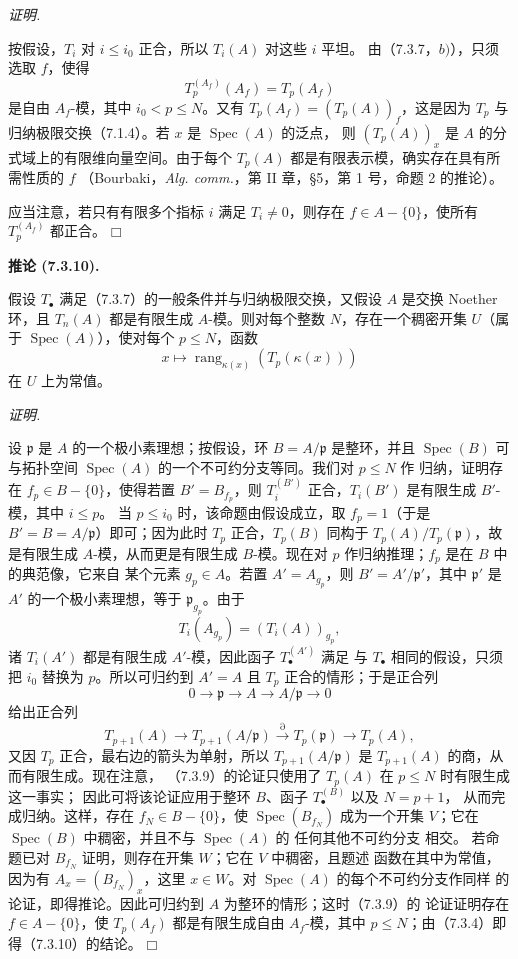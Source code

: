 \documentclass[UTF8,fontset=none,11pt,oneside,openany]{ctexbook}
\providecommand{\square}{\mdlgwhtsquare}
\newenvironment{corollary}[1][]{%
  \par\medskip\noindent\textbf{推论 (#1).}\ %
}{\par}
\newenvironment{proof}{%
  \par\smallskip\noindent\textit{证明.}\ %
}{\hfill$\square$\par}
\newcommand{\oldpage}[2][]{%
  \hypertarget{ega-source-page-#1-#2}{}%
  \marginnote{\scriptsize\textbf{#1}~|~#2}\ignorespaces}
\begin{document}
\begin{proof}
按假设，$T_i$ 对 $i\leq i_0$ 正合，所以 $T_i(A)$ 对这些 $i$ 平坦。
由（7.3.7，$b)$），只须选取 $f$，使得
\[
  T_p^{(A_f)}(A_f)=T_p(A_f)
\]
是自由 $A_f$-模，其中 $i_0<p\leq N$。又有
$T_p(A_f)=(T_p(A))_f$，这是因为 $T_p$ 与归纳极限交换（7.1.4）。若
$x$ 是 $\operatorname{Spec}(A)$ 的泛点，
则 $(T_p(A))_x$ 是 $A$ 的分式域上的有限维向量空间。由于每个
$T_p(A)$ 都是有限表示模，确实存在具有所需性质的 $f$
（Bourbaki，\emph{Alg. comm.}，第 II 章，\S 5，第 1 号，命题 2 的推论）。

应当注意，若只有有限多个指标 $i$ 满足 $T_i\ne0$，则存在
$f\in A-\{0\}$，使所有 $T_p^{(A_f)}$ 都正合。
\end{proof}

\begin{corollary}[7.3.10]
假设 $T_\bullet$ 满足（7.3.7）的一般条件并与归纳极限交换，又假设
$A$ 是交换 Noether 环，且 $T_n(A)$ 都是有限生成 $A$-模。则对每个整数
$N$，存在一个稠密开集 $U$（属于 $\operatorname{Spec}(A)$），使对每个
$p\leq N$，函数
\[
  x\mapsto\operatorname{rang}_{\kappa(x)}(T_p(\kappa(x)))
\]
在 $U$ 上为常值。
\end{corollary}

\begin{proof}
设 $\mathfrak p$ 是 $A$ 的一个极小素理想；按假设，环
$B=A/\mathfrak p$ 是整环，并且 $\operatorname{Spec}(B)$ 可与拓扑空间
$\operatorname{Spec}(A)$ 的一个不可约分支等同。我们对 $p\leq N$ 作
归纳，证明存在 $f_p\in B-\{0\}$，使得若置 $B'=B_{f_p}$，则
$T_i^{(B')}$ 正合，$T_i(B')$ 是有限生成 $B'$-模，其中 $i\leq p$。
当 $p\leq i_0$ 时，该命题由假设成立，取 $f_p=1$（于是
$B'=B=A/\mathfrak p$）即可；因为此时 $T_p$ 正合，$T_p(B)$ 同构于
$T_p(A)/T_p(\mathfrak p)$，故是有限生成 $A$-模，从而更是有限生成
$B$-模。现在对 $p$ 作归纳推理；$f_p$ 是在 $B$ 中的典范像，它来自
某个元素 $g_p\in A$。若置 $A'=A_{g_p}$，则 $B'=A'/\mathfrak p'$，其中
$\mathfrak p'$ 是 $A'$ 的一个极小素理想，等于 $\mathfrak p_{g_p}$。由于
\[
  T_i(A_{g_p})=(T_i(A))_{g_p},
\]
诸 $T_i(A')$ 都是有限生成 $A'$-模，因此函子 $T_\bullet^{(A')}$ 满足
与 $T_\bullet$ 相同的假设，只须把 $i_0$ 替换为 $p$。所以可归约到
$A'=A$ 且 $T_p$ 正合的情形；于是正合列
\[
  0\longrightarrow\mathfrak p\longrightarrow A\longrightarrow A/\mathfrak p
  \longrightarrow0
\]
给出正合列
\[
  T_{p+1}(A)\longrightarrow T_{p+1}(A/\mathfrak p)
  \xrightarrow{\partial}T_p(\mathfrak p)\longrightarrow T_p(A),
\]
又因 $T_p$ 正合，最右边的箭头为单射，所以
$T_{p+1}(A/\mathfrak p)$ 是 $T_{p+1}(A)$ 的商，从而有限生成。现在注意，
（7.3.9）的论证只使用了 $T_p(A)$ 在 $p\leq N$ 时有限生成这一事实；
因此可将该论证应用于整环 $B$、函子 $T_\bullet^{(B)}$ 以及 $N=p+1$，
从而完成归纳。这样，存在 $f_N\in B-\{0\}$，使
$\operatorname{Spec}(B_{f_N})$ 成为一个开集 $V$；它在
$\operatorname{Spec}(B)$ 中稠密，并且不与 $\operatorname{Spec}(A)$ 的
任何其他不可约分支
相交。
\oldpage[III]{185}
若命题已对 $B_{f_N}$ 证明，则存在开集 $W$；它在 $V$ 中稠密，且题述
函数在其中为常值，因为有 $A_x=(B_{f_N})_x$，这里 $x\in W$。对
$\operatorname{Spec}(A)$ 的每个不可约分支作同样
的论证，即得推论。因此可归约到 $A$ 为整环的情形；这时（7.3.9）的
论证证明存在 $f\in A-\{0\}$，使 $T_p(A_f)$ 都是有限生成自由
$A_f$-模，其中 $p\leq N$；由（7.3.4）即得（7.3.10）的结论。
\end{proof}
\end{document}

